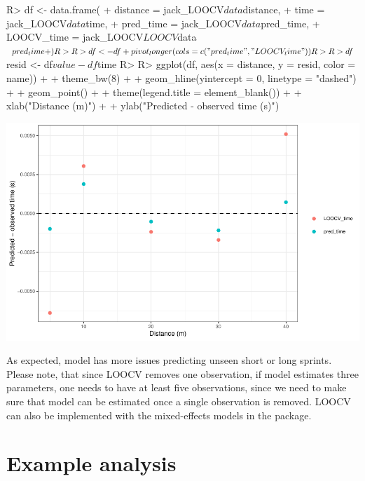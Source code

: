 \documentclass[
]{jss}
\begin{document}
\begin{CodeChunk}
\begin{CodeInput}
R> df <- data.frame(
+   distance = jack_LOOCV$data$distance,
+   time = jack_LOOCV$data$time,
+   pred_time = jack_LOOCV$data$pred_time,
+   LOOCV_time = jack_LOOCV$LOOCV$data$pred_time
+ )
R> 
R> df <- df %
+   pivot_longer(cols = c("pred_time", "LOOCV_time"))
R> 
R> df$resid <- df$value - df$time
R> 
R> ggplot(df, aes(x = distance, y = resid, color = name)) +
+   theme_bw(8) +
+   geom_hline(yintercept = 0, linetype = "dashed") +
+   geom_point() +
+   theme(legend.title = element_blank()) +
+   xlab("Distance (m)") +
+   ylab("Predicted - observed time (s)")
\end{CodeInput}


\begin{center}\includegraphics[width=1\linewidth]{paper_files/figure-latex/unnamed-chunk-57-1} \end{center}

\end{CodeChunk}

As expected, model has more issues predicting unseen short or long sprints. Please note, that since LOOCV removes one observation, if model estimates three parameters, one needs to have at least five observations, since we need to make sure that model can be estimated once a single observation is removed. LOOCV can also be implemented with the mixed-effects models in the  package.

\hypertarget{example-analysis}{%
\section{Example analysis}\label{example-analysis}}
\end{document}

